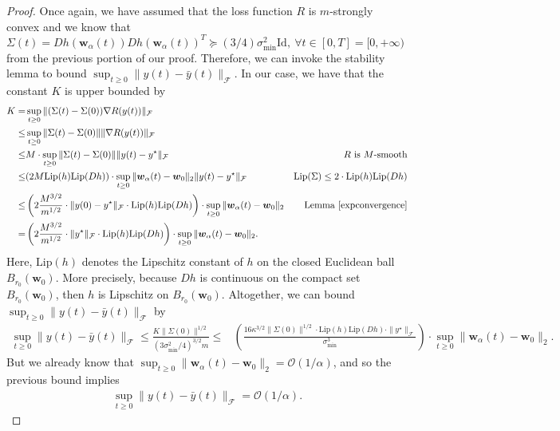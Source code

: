 \documentclass{article}
\begin{document}
\begin{proof}
Once again, we have assumed that the loss function $R$ is $m$-strongly convex and we know that $\Sigma(t) = Dh(\boldsymbol{w}_{\alpha}(t))Dh(\boldsymbol{w}_{\alpha}(t))^T \succeq (3/4) \sigma_{\text{min}}^2 \text{Id}, \ \forall t \in [0, T] = [0, +\infty)$ from the previous portion of our proof.  Therefore, we can invoke the stability lemma to bound $\sup_{t \geq 0} \|y(t) - \bar{y}(t) \|_{\mathcal{F}}$. In our case, we have that the constant $K$ is upper bounded by
\begin{align*}
    K =& \sup_{t \geq 0} \|(\Sigma(t) - \Sigma(0)) \nabla R(y(t))\|_{\mathcal{F}}\\
    \leq& \sup_{t \geq 0} \| \Sigma(t) - \Sigma(0)\| \| \nabla R(y(t))\|_{\mathcal{F}}\\
    \leq& M \cdot \sup_{t \geq 0} \| \Sigma(t) - \Sigma(0)\|\|y(t) - y^{\star} \|_{\mathcal{F}} & \text{$R$ is $M$-smooth}\\
    \leq& (2M \text{Lip}(h) \text{Lip}(Dh)) \cdot \sup_{t \geq 0} \|\boldsymbol{w}_{\alpha}(t) - \boldsymbol{w}_0 \|_2 \|y(t) - y^{\star} \|_{\mathcal{F}} & \text{Lip}(\Sigma) \leq 2 \cdot \text{Lip}(h) \text{Lip}(Dh) \\
    \leq& \left(2\frac{M^{3/2}}{m^{1/2}} \cdot \|y(0) - y^{\star}\|_{\mathcal{F}} \cdot  \text{Lip}(h)\text{Lip}(Dh) \right) \cdot \sup_{t \geq 0} \|\boldsymbol{w}_{\alpha}(t) - \boldsymbol{w}_0 \|_2 & \text{Lemma \ref{expconvergence}}\\
    =& \left(2\frac{M^{3/2}}{m^{1/2}} \cdot \|y^{\star}\|_{\mathcal{F}} \cdot  \text{Lip}(h)\text{Lip}(Dh) \right) \cdot \sup_{t \geq 0} \|\boldsymbol{w}_{\alpha}(t) - \boldsymbol{w}_0 \|_2.
\end{align*}
Here, $\text{Lip}(h)$ denotes the Lipschitz constant of $h$ on the closed Euclidean ball $B_{r_0}(\boldsymbol{w}_0)$. More precisely, because $Dh$ is continuous on the compact set $B_{r_0}(\boldsymbol{w}_0)$, then $h$ is Lipschitz on $B_{r_0}(\boldsymbol{w}_0)$. Altogether, we can bound $\sup_{t \geq 0}\| y(t) - \bar{y}(t) \|_{\mathcal{F}}$ by
\begin{align*}
    \sup_{t \geq 0} \|y(t) - \bar{y}(t) \|_{\mathcal{F}} \leq \frac{K \|\Sigma(0) \|^{1/2}}{(3\sigma_{\text{min}}^2/4)^{3/2}m} \leq& \left( \frac{16\kappa^{3/2} \|\Sigma(0) \|^{1/2} \cdot  \text{Lip}(h)\text{Lip}(Dh) \cdot \|y^{\star} \|_{\mathcal{F}}}{\sigma_{\text{min}}^3} \right) \cdot \sup_{t \geq 0} \|\boldsymbol{w}_{\alpha}(t) - \boldsymbol{w}_0 \|_2.
\end{align*}
But we already know that $\sup_{t \geq 0} \|\boldsymbol{w}_{\alpha}(t) - \boldsymbol{w}_0 \|_2 = \mathcal{O}(1/\alpha)$, and so the previous bound implies 
\begin{align*}
    \sup_{t \geq 0} \|y(t) - \bar{y}(t) \|_{\mathcal{F}} = \mathcal{O}(1/\alpha).
\end{align*}


\end{proof}
\end{document}
